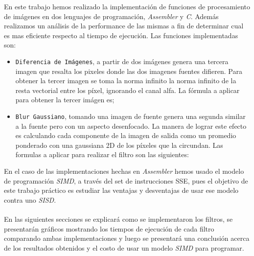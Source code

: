 \indent En este trabajo hemos realizado la implementaci\'on de funciones de procesamiento de im\'agenes en dos lenguajes de programaci\'on, \emph{Assembler} y \emph{C}. Adem\'as realizamos un an\'alisis de la performance de las mismas a fin de determinar cual es mas eficiente respecto al tiempo de ejecuci\'on. Las funciones implementadas son: \\

\begin{itemize}
	\item \texttt{Diferencia de Im\'agenes}, a partir de dos im\'agenes genera una tercera imagen que resalta los pixeles donde las dos imagenes fuentes difieren. Para obtener la tercer imagen se toma la norma infinito la norma infinito de la resta vectorial entre los píxel, ignorando el canal alfa. La f\'ormula a aplicar para obtener la tercer im\'agen es;


	\item \texttt{Blur Gaussiano}, tomando una imagen de fuente genera una segunda similar a la fuente pero con un aspecto desenfocado. La manera de lograr este efecto es calculando cada componente de la imagen de salida como un promedio ponderado con una gaussiana 2D de los píxeles que la circundan. Las formulas a aplicar para realizar el filtro son las siguientes:




\end{itemize}

\indent En el caso de las implementaciones hechas en \textit{Assembler} hemos usado el modelo de programaci\'on \textit{SIMD}, a través del set de instrucciones {\ttfamily SSE}, pues el objetivo de este trabajo pr\'actico es estudiar las ventajas y desventajas de usar ese modelo contra uno \textit{SISD}.\\ \\
\indent En las siguientes secciones se explicar\'a como se implementaron los filtros, se presentar\'an gr\'aficos mostrando los tiempos de ejecuci\'on de cada filtro comparando ambas implementaciones y luego se presentar\'a una conclusi\'on acerca de los resultados obtenidos y el costo de usar un modelo \textit{SIMD} para programar.

